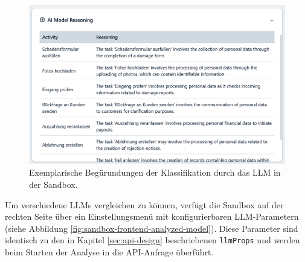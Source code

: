 \begin{figure}
    \centering
    \includegraphics[width=\linewidth]{images/sandbox/sandbox-ai-reasoning}
    \caption{Exemplarische Begürundungen der Klassifikation durch das LLM in der Sandbox.}
    \label{fig:sandbox-frontend-ai-reasoning}
\end{figure}

Um verschiedene \acp{LLM} vergleichen zu können, verfügt die Sandbox auf der rechten Seite über ein Einstellungsmenü mit konfigurierbaren \ac{LLM}-Parametern (siehe Abbildung \ref{fig:sandbox-frontend-analyzed-model}). Diese Parameter sind identisch zu den in Kapitel \ref{sec:api-design} beschriebenen \texttt{llmProps} und werden beim Starten der Analyse in die API-Anfrage überführt.